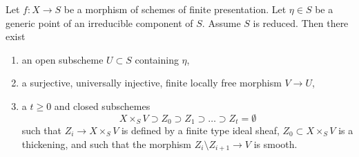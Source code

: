 \begin{lemma}
\label{lemma-smoothness-stratification-at-generic-point}
Let $f : X \to S$ be a morphism of schemes of finite presentation.
Let $\eta \in S$ be a generic point of an irreducible component of $S$.
Assume $S$ is reduced. Then there exist
\begin{enumerate}
\item an open subscheme $U \subset S$ containing $\eta$,
\item a surjective, universally injective, finite locally free
morphism $V \to U$,
\item a $t \geq 0$ and closed subschemes
$$
X \times_S V \supset Z_0 \supset Z_1 \supset \ldots \supset Z_t = \emptyset
$$
such that $Z_i \to X \times_S V$ is defined by a finite type ideal sheaf,
$Z_0 \subset X \times_S V$ is a thickening, and such that the morphism
$Z_i \setminus Z_{i + 1} \to V$ is smooth.
\end{enumerate}
\end{lemma}

